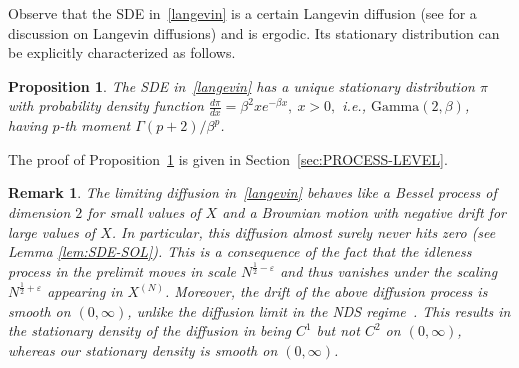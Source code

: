 \documentclass[11pt, reqno]{article}
\newtheorem{prop}[theorem]{Proposition}
\newtheorem{remark}[theorem]{Remark}
\numberwithin{equation}{section}
\numberwithin{theorem}{section}
\newcommand\blue[1]{#1}
\begin{document}
Observe that the SDE in~\eqref{langevin} is a certain Langevin diffusion \blue{(see \cite[Section 1.2]{RT96} for a discussion on Langevin diffusions)} and is ergodic.
Its stationary distribution can be explicitly characterized as follows. 
\begin{prop}\label{prop:STEADY-STATE}
The SDE
in~\eqref{langevin} 
has a unique stationary distribution $\pi$ with probability density function 
$    \frac{d\pi}{dx}=\beta^2 xe^{-\beta x},\  x>0,$ i.e., $\mathrm{Gamma}(2,\beta)$,
having $p$-th moment $\Gamma(p+2)/\beta^p$.
\end{prop}
The proof of Proposition~\ref{prop:STEADY-STATE} is given in Section~\ref{sec:PROCESS-LEVEL}.
\begin{remark}
The limiting diffusion in~\eqref{langevin} behaves like a Bessel process of dimension $2$ for small values of $X$ and a Brownian motion with negative drift for large values of $X$. In particular, this diffusion almost surely never hits zero (see Lemma \ref{lem:SDE-SOL}). This is a consequence of the fact that the idleness process in the prelimit moves in scale $N^{\frac{1}{2} - \varepsilon}$ and thus vanishes under the scaling $N^{\frac{1}{2} + \varepsilon}$ appearing in $X^{(N)}$. Moreover, the drift of the above diffusion process is smooth on $(0,\infty)$, unlike the diffusion limit in the NDS regime~\cite{GW19}. This results in the stationary density of the diffusion in \cite{GW19} being $C^1$ but not $C^2$ on $(0,\infty)$, whereas our stationary density is smooth on $(0,\infty)$.
\end{remark}
\end{document}
